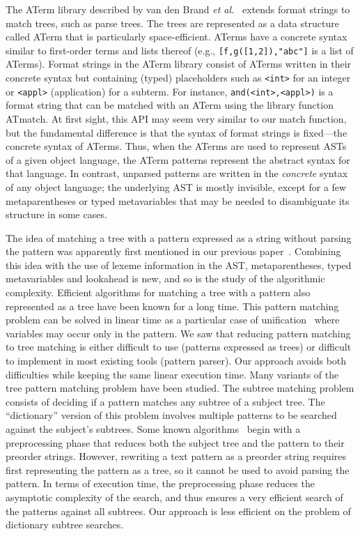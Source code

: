 The ATerm library described by van den Brand \emph{et
  al.}~\cite{aterms} extends format strings to match trees, such as
parse trees. The trees are represented as a data structure called
ATerm that is particularly space\hyp{}efficient. ATerms have a
concrete syntax similar to first\hyp{}order terms and lists thereof
(e.g., \texttt{[f,g([1,2]),"abc"]} is a list of ATerms). Format
strings in the ATerm library consist of ATerms written in their
concrete syntax but containing (typed) placeholders such as
\texttt{<int>} for an integer or \texttt{<appl>} (application) for a
sub\-term. For instance, \texttt{and(<int>,<appl>)} is a format string
that can be matched with an ATerm using the library function
ATmatch. At first sight, this API may seem very similar to our match
function, but the fundamental difference is that the syntax of format
strings is fixed---the concrete syntax of ATerms. Thus, when the
ATerms are used to represent ASTs of a given object language, the
ATerm patterns represent the abstract syntax for that language. In
contrast, unparsed patterns are written in the \emph{concrete} syntax
of any object language; the underlying AST is mostly invisible, except
for a few meta\-parentheses or typed meta\-variables that may be
needed to disambiguate its structure in some cases.

The idea of matching a tree with a pattern expressed as a string
without parsing the pattern was apparently first mentioned in our
previous paper~\cite{ppdp}. Combining this idea with the use of lexeme
information in the AST, meta\-parentheses, typed meta\-variables and
lookahead is new, and so is the study of the algorithmic
complexity. Efficient algorithms for matching a tree with a pattern
also represented as a tree have been known for a long time. This
pattern matching problem can be solved in linear time as a particular
case of unification~\cite{unification} where variables may occur only
in the pattern. We saw that reducing pattern matching to tree matching
is either difficult to use (patterns expressed as trees) or difficult
to implement in most existing tools (pattern parser). Our approach
avoids both difficulties while keeping the same linear execution
time. Many variants of the tree pattern matching problem have been
studied. The subtree matching problem consists of deciding if a
pattern matches any subtree of a subject tree. The ``dictionary''
version of this problem involves multiple patterns to be searched
against the subject's subtrees. Some known algorithms~\cite{rooted}
begin with a pre\-processing phase that reduces both the subject tree
and the pattern to their pre\-order strings. However, re\-writing a
text pattern as a pre\-order string requires first representing the
pattern as a tree, so it cannot be used to avoid parsing the
pattern. In terms of execution time, the preprocessing phase reduces
the asymptotic complexity of the search, and thus ensures a very
efficient search of the patterns against all subtrees. Our approach is
less efficient on the problem of dictionary subtree searches.


